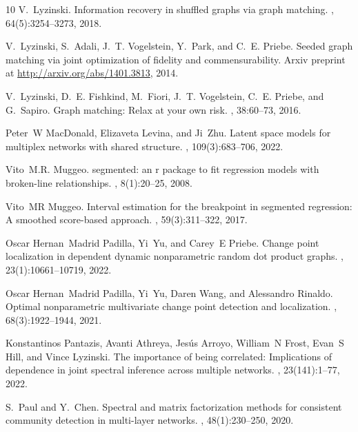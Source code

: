 \documentclass[12pt]{article}
\theoremstyle{definition}
\begin{document}
\begin{thebibliography}{10}
V.~Lyzinski.
\newblock Information recovery in shuffled graphs via graph matching.
, 64(5):3254--3273, 2018.

V.~Lyzinski, S.~Adali, J.~T. Vogelstein, Y.~Park, and C.~E. Priebe.
\newblock Seeded graph matching via joint optimization of fidelity and commensurability.
\newblock Arxiv preprint at \url{http://arxiv.org/abs/1401.3813}, 2014.

V.~Lyzinski, D.~E. Fishkind, M.~Fiori, J.~T. Vogelstein, C.~E. Priebe, and G.~Sapiro.
\newblock Graph matching: Relax at your own risk.
, 38:60--73, 2016.

Peter~W MacDonald, Elizaveta Levina, and Ji~Zhu.
\newblock Latent space models for multiplex networks with shared structure.
, 109(3):683--706, 2022.

Vito~M.R. Muggeo.
\newblock segmented: an r package to fit regression models with broken-line relationships.
, 8(1):20--25, 2008.

Vito~MR Muggeo.
\newblock Interval estimation for the breakpoint in segmented regression: A smoothed score-based approach.
, 59(3):311--322, 2017.

Oscar Hernan~Madrid Padilla, Yi~Yu, and Carey~E Priebe.
\newblock Change point localization in dependent dynamic nonparametric random dot product graphs.
, 23(1):10661--10719, 2022.

Oscar Hernan~Madrid Padilla, Yi~Yu, Daren Wang, and Alessandro Rinaldo.
\newblock Optimal nonparametric multivariate change point detection and localization.
, 68(3):1922--1944, 2021.

Konstantinos Pantazis, Avanti Athreya, Jes{\'u}s Arroyo, William~N Frost, Evan~S Hill, and Vince Lyzinski.
\newblock The importance of being correlated: Implications of dependence in joint spectral inference across multiple networks.
, 23(141):1--77, 2022.

S.~Paul and Y.~Chen.
\newblock Spectral and matrix factorization methods for consistent community detection in multi-layer networks.
, 48(1):230--250, 2020.


\end{thebibliography}
\end{document}
